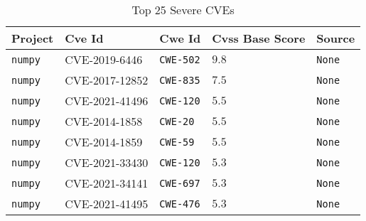 \begin{table}
\caption{Top 25 Severe CVEs}
\label{tab:most-severe-cwe}
\begin{tabular}{lllll}
\toprule
Project & Cve Id & Cwe Id & Cvss Base Score & Source \\
\midrule
\texttt{numpy} & CVE-2019-6446 & \texttt{CWE-502} & $9.8$ & \texttt{None} \\
\texttt{numpy} & CVE-2017-12852 & \texttt{CWE-835} & $7.5$ & \texttt{None} \\
\texttt{numpy} & CVE-2021-41496 & \texttt{CWE-120} & $5.5$ & \texttt{None} \\
\texttt{numpy} & CVE-2014-1858 & \texttt{CWE-20} & $5.5$ & \texttt{None} \\
\texttt{numpy} & CVE-2014-1859 & \texttt{CWE-59} & $5.5$ & \texttt{None} \\
\texttt{numpy} & CVE-2021-33430 & \texttt{CWE-120} & $5.3$ & \texttt{None} \\
\texttt{numpy} & CVE-2021-34141 & \texttt{CWE-697} & $5.3$ & \texttt{None} \\
\texttt{numpy} & CVE-2021-41495 & \texttt{CWE-476} & $5.3$ & \texttt{None} \\
\bottomrule
\end{tabular}
\end{table}
